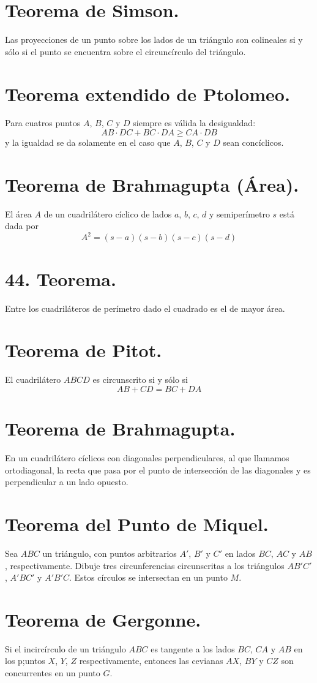 \documentclass[12pt,a4paper]{book}
\begin{document}
\section{Teorema de Simson.}
Las proyecciones de un punto sobre los lados de un triángulo son colineales si y sólo si el punto se encuentra sobre el circuncírculo del triángulo.
\section{Teorema extendido de Ptolomeo.}
Para cuatros puntos $A$, $B$, $C$ y $D$ siempre es válida la desigualdad:$$AB \cdot DC + BC\cdot DA \geq CA \cdot DB$$ 
y la igualdad se da solamente en el caso que $A$, $B$, $C$ y $D$ sean concíclicos.
\section{Teorema de Brahmagupta (Área).}
El área $A$ de un cuadrilátero cíclico de lados $a$, $b$, $c$, $d$ y semiperímetro $s$ está dada por $$A^2=(s-a)(s-b)(s-c)(s-d)$$
\section{44. Teorema.}
Entre los cuadriláteros de perímetro dado el cuadrado es el de mayor área.
\section{Teorema de Pitot.}
El cuadrilátero $ABCD$ es circunscrito si y sólo si $$AB + CD = BC +DA$$
\section{Teorema de Brahmagupta.}
En un cuadrilátero cíclicos con diagonales perpendiculares, al que llamamos ortodiagonal, la recta que pasa por el punto de intersección de las diagonales y es perpendicular a un lado opuesto.
\section{Teorema del Punto de Miquel.}
Sea $ABC$ un triángulo, con puntos arbitrarios $A'$, $B'$ y $C'$ en lados $BC$, $AC$ y $AB$ , respectivamente. Dibuje tres circunferencias circunscritas a los triángulos $AB'C'$, $A'BC'$ y $A'B'C$. Estos círculos se intersectan en un punto $M$.
\section{Teorema de Gergonne.}
Si el incircírculo de un triángulo $ABC$ es tangente a los lados $BC$, $CA$ y $AB$ en los p;untos $X$, $Y$, $Z$ respectivamente, entonces las cevianas  $AX$, $BY$ y $CZ$ son concurrentes en un punto $G.$
\end{document}
